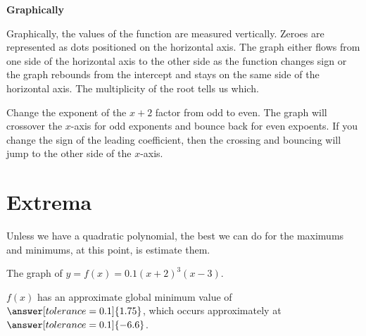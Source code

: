 \documentclass{ximera}
\begin{document}
\textbf{\large Graphically}


Graphically, the values of the function are measured vertically. Zeroes are represented as dots positioned on the horizontal axis.  The graph either flows from one side of the horizontal axis to the other side as the function changes sign or the graph rebounds from the intercept and stays on the same side of the horizontal axis.  The multiplicity of the root tells us which.






\begin{example}

Change the exponent of the $x+2$ factor from odd to even.  The graph will crossover the $x$-axis for odd exponents and bounce back for even expoents.  If you change the sign of the leading coefficient, then the crossing and bouncing will jump to the other side of the $x$-axis.



\begin{center}
\end{center}

\end{example}






















\section{Extrema}

Unless we have a quadratic polynomial, the best we can do for the maximums and minimums, at this point, is estimate them.







\begin{example}

The graph of $y = f(x) = 0.1(x+2)^3(x-3)$.



\begin{center}
\end{center}



$f(x)$ has an approximate global minimum value of $\answer[tolerance=0.1]{1.75}$, which occurs approximately at $\answer[tolerance=0.1]{-6.6}$.


\end{example}
\end{document}
